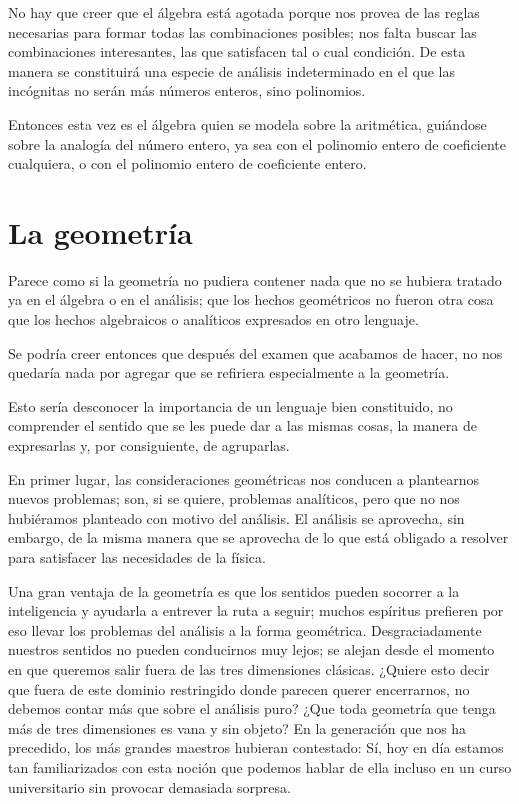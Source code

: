 \documentclass[a4paper, 12pt]{article}
\begin{document}
No hay que creer que el álgebra está agotada porque nos provea de
las reglas necesarias para formar todas las combinaciones posibles; nos
falta buscar las combinaciones interesantes, las que satisfacen tal o cual
condición. De esta manera se constituirá una especie de análisis
indeterminado en el que las incógnitas no serán más números
enteros, sino polinomios.

Entonces esta vez es el álgebra quien se modela sobre la aritmética,
guiándose sobre la analogía del número entero, ya sea con el
polinomio entero de coeficiente cualquiera, o con el polinomio entero de
coeficiente entero.

\section*{La geometría}


Parece como si la geometría no pudiera contener nada que no se
hubiera tratado ya en el álgebra o en el análisis; que los hechos
geométricos no fueron otra cosa que los hechos algebraicos o analíticos expresados en otro lenguaje.

Se podría creer entonces que después del examen que acabamos de
hacer, no nos quedaría nada por agregar que se refiriera especialmente
a la geometría.

Esto sería desconocer la importancia de un lenguaje bien constituido,
no comprender el sentido que se les puede dar a las mismas cosas, la manera
de expresarlas y, por consiguiente, de agruparlas.


En primer lugar, las consideraciones geométricas nos conducen a
plantearnos nuevos problemas; son, si se quiere, problemas analíticos,
pero que no nos hubiéramos planteado con motivo del análisis. El análisis se aprovecha, sin embargo, de la misma manera que se aprovecha de
lo que está obligado a resolver para satisfacer las necesidades de la física.



Una gran ventaja de la geometría es que los sentidos pueden socorrer a
la inteligencia y ayudarla a entrever la ruta a seguir; muchos espíritus prefieren por eso llevar los problemas del análisis a la forma geométrica. Desgraciadamente nuestros sentidos no pueden conducirnos muy
lejos; se alejan desde el momento en que queremos salir fuera de las tres
dimensiones clásicas. ¿Quiere esto decir que fuera de este dominio
restringido donde parecen querer encerrarnos, no debemos contar más que
sobre el análisis puro? ¿Que toda geometría que tenga más de
tres dimensiones es vana y sin objeto? En la generación que nos ha
precedido, los más grandes maestros hubieran contestado: \guillemotleft 
Sí, hoy en día estamos tan familiarizados con esta noción que
podemos hablar de ella incluso en un curso universitario sin provocar
demasiada sorpresa.\guillemotright 
\end{document}
